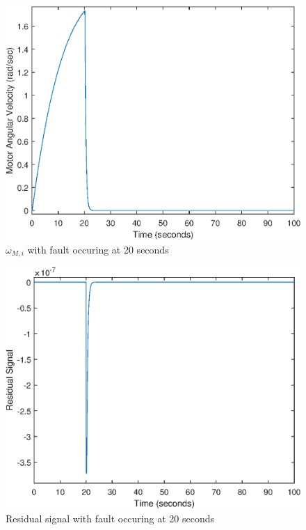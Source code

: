 \begin{figure}
	\centering
	\includegraphics[width=120mm]{figures/omega_reconfig}
	\caption{$\omega_{M,i}$ with fault occuring at 20 seconds}
\end{figure} 


\begin{figure}
	\centering
	\includegraphics[width=120mm]{figures/residual_reconfig}
	\caption{Residual signal with fault occuring at 20 seconds}
\end{figure} 

